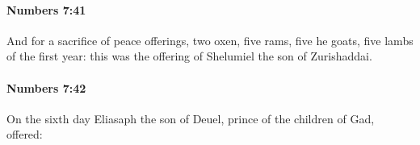 		\paragraph{Numbers 7:41} %
			\label{NUMBERS-7-41}

			And for a sacrifice of peace offerings, two oxen, five rams, five he goats, five lambs of the first year: this was the offering of Shelumiel the son of Zurishaddai.


		\paragraph{Numbers 7:42} %
			\label{NUMBERS-7-42}

			On the sixth day Eliasaph the son of Deuel, prince of the children of Gad, offered:


